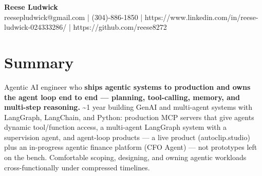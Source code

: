 \documentclass[10pt]{article}
\begin{document}
\begin{center}
{\fontsize{14}{16}\selectfont\bfseries Reese Ludwick}\\[1pt]
{\fontsize{9}{11}\selectfont reesepludwick@gmail.com | (304)-886-1850 | https://www.linkedin.com/in/reese-ludwick-024333286/ | https://github.com/reese8272}
\end{center}
\vspace{-2pt}
\section*{Summary}
\noindent Agentic AI engineer who \textbf{ships agentic systems to production and owns the agent loop end to end — planning, tool-calling, memory, and multi-step reasoning.} \textasciitilde{}1 year building GenAI and multi-agent systems with LangGraph, LangChain, and Python: production MCP servers that give agents dynamic tool/function access, a multi-agent LangGraph system with a supervision agent, and agent-loop products — a live product (autoclip.studio) plus an in-progress agentic finance platform (CFO Agent) — not prototypes left on the bench. Comfortable scoping, designing, and owning agentic workloads cross-functionally under compressed timelines.\par
\end{document}
